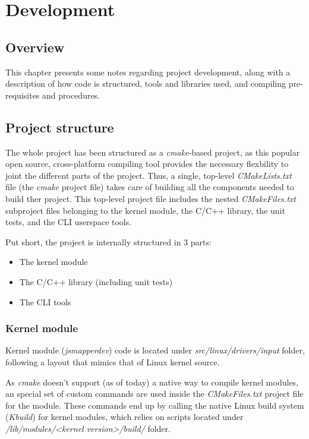 \chapter{Development}\label{chap:development}
\section{Overview} 
This chapter presents some notes regarding project development, along with a description of how code is structured, tools and libraries used, and compiling pre-requisites and procedures.

\section{Project structure}
The whole project has been structured as a \emph{cmake}-based project, as this popular open source, cross-platform compiling tool provides the necessary flexbility to joint the different parts of the project. Thus, a single, top-level \emph{CMakeLists.txt} file (the \emph{cmake} project file) takes care of building all the components needed to build ther project. This top-level project file includes the nested \emph{CMakeFiles.txt} subproject files belonging to the kernel module, the C/C++ library, the unit tests, and the CLI userspace tools.

Put short, the project is internally structured in 3 parts:
\begin{itemize}
	\item The kernel module
	\item The C/C++ library (including unit tests)
	\item The CLI tools
\end{itemize}


\subsection{Kernel module}
Kernel module (\emph{jsmapperdev}) code is located under \emph{src/linux/drivers/input} folder, following a layout that mimics that of Linux kernel source. 

As \emph{cmake} doesn't support (as of today) a native way to compile kernel modules, an special set of custom commands are used inside the \emph{CMakeFiles.txt} project file for the module. These commands end up by calling the native Linux build system (\emph{Kbuild}) for kernel modules, which relies on scripts located under \emph{/lib/modules/<kernel version>/build/} folder.

